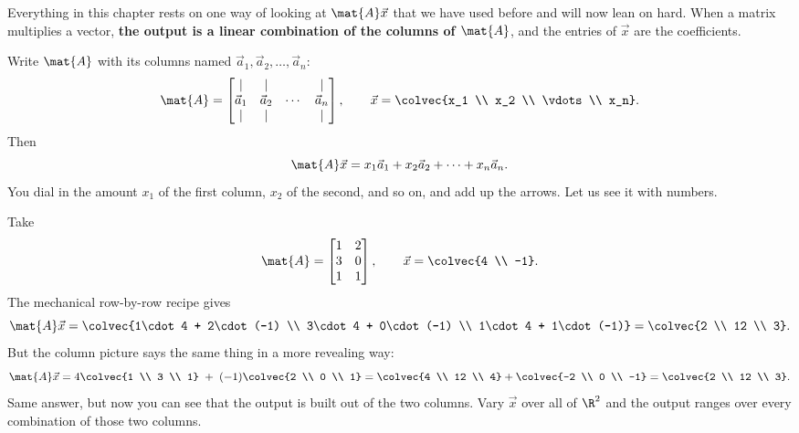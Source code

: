 Everything in this chapter rests on one way of looking at $\mat{A}\vec{x}$ that
we have used before and will now lean on hard. When a matrix multiplies a
vector, \textbf{the output is a linear combination of the columns of
$\mat{A}$}, and the entries of $\vec{x}$ are the coefficients.

Write $\mat{A}$ with its columns named $\vec{a}_1, \vec{a}_2, \dots, \vec{a}_n$:
\[
  \mat{A} = \begin{bmatrix} \vert & \vert & & \vert \\
  \vec{a}_1 & \vec{a}_2 & \cdots & \vec{a}_n \\
  \vert & \vert & & \vert \end{bmatrix},
  \qquad
  \vec{x} = \colvec{x_1 \\ x_2 \\ \vdots \\ x_n}.
\]
Then
\[
  \mat{A}\vec{x} = x_1 \vec{a}_1 + x_2 \vec{a}_2 + \cdots + x_n \vec{a}_n.
\]
You dial in the amount $x_1$ of the first column, $x_2$ of the second, and so on,
and add up the arrows. Let us see it with numbers.

\begin{example}\label{ch12:ax-as-combo}
Take
\[
  \mat{A} = \begin{bmatrix} 1 & 2 \\ 3 & 0 \\ 1 & 1 \end{bmatrix},
  \qquad \vec{x} = \colvec{4 \\ -1}.
\]
The mechanical row-by-row recipe gives
\[
  \mat{A}\vec{x} = \colvec{1\cdot 4 + 2\cdot(-1) \\ 3\cdot 4 + 0\cdot(-1)
  \\ 1\cdot 4 + 1\cdot(-1)} = \colvec{2 \\ 12 \\ 3}.
\]
But the column picture says the same thing in a more revealing way:
\[
  \mat{A}\vec{x} = 4\colvec{1 \\ 3 \\ 1} \;+\; (-1)\colvec{2 \\ 0 \\ 1}
  = \colvec{4 \\ 12 \\ 4} + \colvec{-2 \\ 0 \\ -1} = \colvec{2 \\ 12 \\ 3}.
\]
Same answer, but now you can see that the output is built out of the two
columns. Vary $\vec{x}$ over all of $\R^2$ and the output ranges over every
combination of those two columns.
\end{example}

